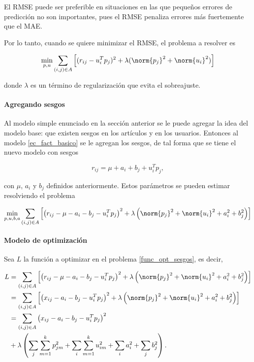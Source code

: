 El RMSE puede ser preferible en situaciones en las que pequeños errores de predicción no son importantes, pues el RMSE penaliza errores más fuertemente que el MAE.

Por lo tanto, cuando se quiere minimizar el RMSE, el problema a resolver es

\begin{equation}
\min_{p, u} \sum_{(i,j) \in A} \left [ (r_{ij} - u_i^Tp_j )^2 + \lambda ( \norm{p_j}^2 + \norm{u_i}^2 ) \right ]
\end{equation}

donde $\lambda$ es un término de regularización que evita el sobreajuste.

\paragraph{Agregando sesgos}

Al modelo simple enunciado en la sección anterior se le puede agregar la idea del modelo base: que existen sesgos en los artículos y en los usuarios. Entonces al modelo \ref{ec_fact_basico} se le agregan los sesgos, de tal forma que se tiene el nuevo modelo con sesgos

\begin{equation}\label{ec_fact_sesgo}
r_{ij} = \mu + a_i + b_j + u_i^T p_j,
\end{equation}

con $\mu$, $a_i$ y $b_j$ definidos anteriormente. Estos parámetros se pueden estimar resolviendo el problema

\begin{equation}\label{func_opt_sesgos}
  \min_{p, u, b, a} \sum_{(i,j) \in A} \left [ \left( r_{ij} - \mu - a_i - b_j - u_i^T p_j \right) ^2 + \lambda \left( \norm{p_j}^2 + \norm{u_i}^2 + a_i^2 + b_j^2 \right) \right ]
\end{equation}

\paragraph{Modelo de optimización}

Sea $L$ la función a optimizar en el problema \ref{func_opt_sesgos}, es decir,

\[
\begin{split}
L 
& = \sum_{(i,j) \in A} \left [ \left( r_{ij} - \mu - a_i - b_j - u_i^T p_j \right) ^2 + 
\lambda \left( \norm{p_j}^2 + \norm{u_i}^2 + a_i^2 + b_j^2 \right) \right ] \\
& = \sum_{(i,j) \in A} \left [ \left( x_{ij} - a_i - b_j - u_i^T p_j \right) ^2 + \lambda \left( \norm{p_j}^2 + \norm{u_i}^2 + a_i^2 + b_j^2 \right) \right ] \\
& = \sum_{(i,j) \in A} \left( x_{ij} - a_i - b_j - u_i^T p_j \right) ^2 \\
& + \lambda \left( 
\sum_j \sum_{m = 1}^{k}p_{jm}^2 + 
\sum_i \sum_{m = 1}^{k}u_{im}^2 + 
\sum_i a_i^2 + 
\sum_j b_j^2 \right) .
\end{split}
\]

